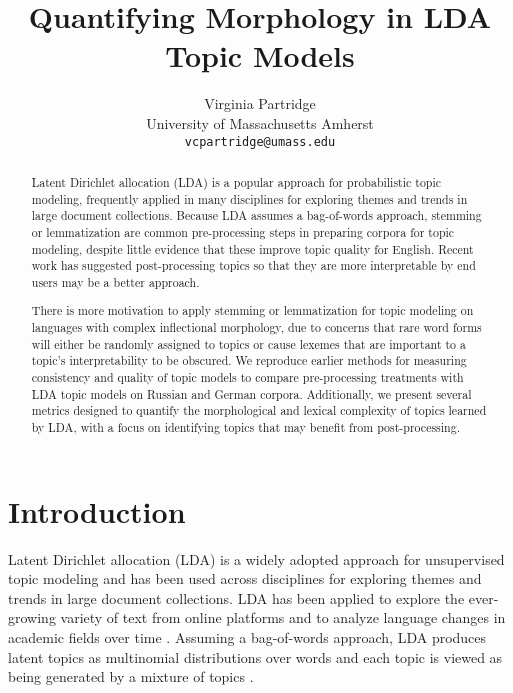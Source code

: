 \documentclass[11pt,a4paper]{article}
\title{Quantifying Morphology in LDA Topic Models}
\author{Virginia Partridge \\
  University of Massachusetts Amherst\\
  \texttt{vcpartridge@umass.edu}
}
\date{}
\begin{document}
\maketitle
\begin{abstract}
    Latent Dirichlet allocation (LDA) is a popular approach for probabilistic topic modeling, frequently applied in many disciplines for exploring themes and trends in large document collections. Because LDA assumes a bag-of-words approach, stemming or lemmatization are common pre-processing steps in preparing corpora for topic modeling, despite little evidence that these improve topic quality for English. Recent work has suggested post-processing topics so that they are more interpretable by end users may be a better approach.

    There is more motivation to apply stemming or lemmatization for topic modeling on languages with complex inflectional morphology, due to concerns that rare word forms will either be randomly assigned to topics or cause lexemes that are important to a topic's interpretability to be obscured. We reproduce earlier methods for measuring consistency and quality of topic models to compare pre-processing treatments with LDA topic models on Russian and German corpora.
    Additionally, we present several metrics designed to quantify the morphological and lexical complexity of topics learned by LDA, with a focus on identifying topics that may benefit from post-processing.
\end{abstract}

\section{Introduction}
Latent Dirichlet allocation (LDA) is a widely adopted approach for unsupervised topic modeling and has been used across disciplines for exploring themes and trends in large document collections. LDA has been applied to explore the ever-growing variety of text from online platforms and to analyze language changes in academic fields over time \cite{koltsova2013,mcfarland2013differentiating, vogel-jurafsky-2012-said, mitrofanova2015probabilistic}. Assuming a bag-of-words approach, LDA produces latent topics as multinomial distributions over words and each topic is viewed as being generated by a mixture of topics \cite{blei2003,steyvers2007probabilistic}.
\end{document}
